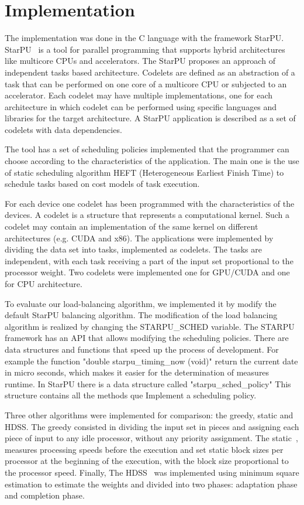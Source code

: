 \documentclass[journal]{IEEEtran}
\begin{document}
\section{Implementation}

The implementation was done in the C language with the framework StarPU.
StarPU~\cite{starpu} is a tool for parallel programming that supports hybrid
architectures like multicore CPUs and accelerators. The StarPU proposes an
approach of independent tasks based architecture. Codelets are defined as an
abstraction of a task that can be performed on one core of a multicore CPU or
subjected to an accelerator. Each codelet may have multiple implementations, one
for each architecture in which codelet can be performed using specific languages
and libraries for the target architecture. A StarPU application is described as
a set of codelets with data dependencies.

The tool has a set of scheduling policies implemented that the programmer can
choose according to the characteristics of the application. The main one is the
use of static scheduling algorithm HEFT (Heterogeneous Earliest Finish Time) to
schedule tasks based on cost models of task execution.

For each device one codelet has been programmed with the characteristics of the
devices. A codelet is a structure that represents a computational kernel. Such a
codelet may contain an implementation of the same kernel on different
architectures (e.g. CUDA and x86).  The applications were implemented by
dividing the data set into tasks, implemented as codelets. The tasks are
independent, with each task receiving a part of the input set proportional to
the processor weight. Two codelets were implemented one for GPU/CUDA and one for
CPU architecture.

To evaluate our load-balancing algorithm, we implemented it by modify the default StarPU balancing algorithm. The modification of the load balancing algorithm is realized by changing the STARPU\_SCHED variable. The STARPU framework has an API that allows modifying the scheduling policies. There are data structures and functions that speed up the process of development. For example the function "double starpu\_timing\_now (void)"  return the current date in micro seconds, which makes it easier for the determination of measures runtime. In StarPU there is a data structure called "starpu\_sched\_policy" This structure contains all the methods que Implement a scheduling policy. 

Three other algorithms were implemented for comparison: the greedy, static and
HDSS. The greedy consisted in dividing the input set in pieces and assigning
each piece of input to any idle processor, without any priority assignment. The
static~\cite{raphael}, measures processing speeds before the execution and set
static block sizes per processor at the beginning of the execution, with the
block size proportional to the processor speed. Finally, The HDSS~\cite{HDSS}
was implemented using minimum square estimation to estimate the weights and
divided into two phases: adaptation phase and completion phase.
\end{document}
